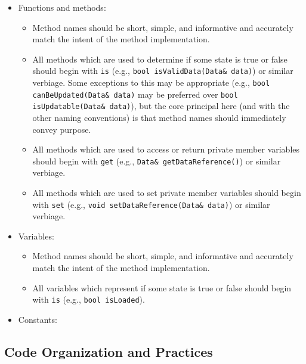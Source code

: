 \begin{itemize}
\begin{itemize}
        \item Functions and methods: 
        \begin{itemize}
            \item Method names should be short, simple, and informative and accurately match the intent of the method implementation.
            \item All methods which are used to determine if some state is true or false should begin with \texttt{is} (e.g., \texttt{bool isValidData(Data\& data)}) or similar verbiage. Some exceptions to this may be appropriate (e.g., \texttt{bool canBeUpdated(Data\& data)} may be preferred over \texttt{bool isUpdatable(Data\& data)}), but the core principal here (and with the other naming conventions) is that method names should immediately convey purpose.
            \item All methods which are used to access or return private member variables should begin with \texttt{get} (e.g., \texttt{Data\& getDataReference()}) or similar verbiage.
            \item All methods which are used to set private member variables should begin with \texttt{set} (e.g., \texttt{void setDataReference(Data\& data)}) or similar verbiage.
        \end{itemize}
        \item Variables: 
        \begin{itemize}
            \item Method names should be short, simple, and informative and accurately match the intent of the method implementation.
            \item All variables which represent if some state is true or false should begin with \texttt{is} (e.g., \texttt{bool isLoaded}).
        \end{itemize}
        \item Constants:  
    \end{itemize}
\end{itemize}




\subsection{Code Organization and Practices}

